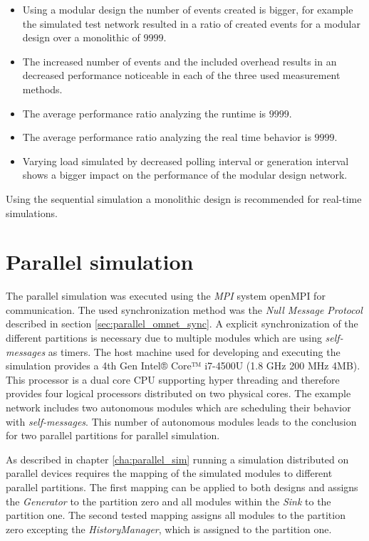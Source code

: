 \begin{itemize}
    \item Using a modular design the number of events created is bigger, for example the simulated test network resulted in a ratio of created events for a modular design over a monolithic of $9999$. %
    \item The increased number of events and the included overhead results in an decreased performance noticeable in each of the three used measurement methods.
    \item The average performance ratio analyzing the runtime is $9999$. %
    \item The average performance ratio analyzing the real time behavior is $9999$. %
    \item Varying load simulated by decreased polling interval or generation interval shows a bigger impact on the performance of the modular design network.
\end{itemize}

Using the sequential simulation a monolithic design is recommended for real-time simulations.


\section{Parallel simulation}
\label{sec:measurements_parallel}
The parallel simulation was executed using the \emph{MPI} system openMPI for communication.
The used synchronization method was the \emph{Null Message Protocol} described in section \ref{sec:parallel_omnet_sync}.
A explicit synchronization of the different partitions is necessary due to multiple modules which are using \emph{self-messages} as timers.
The host machine used for developing and executing the simulation provides a 4th Gen Intel® Core™ i7-4500U (1.8 GHz 200 MHz 4MB).
This processor is a dual core CPU supporting hyper threading and therefore provides four logical processors distributed on two physical cores.
The example network includes two autonomous modules which are scheduling their behavior with \emph{self-messages}.
This number of autonomous modules leads to the conclusion for two parallel partitions for parallel simulation.

As described in chapter \ref{cha:parallel_sim} running a simulation distributed on parallel devices requires the mapping of the simulated modules to different parallel partitions.
The first mapping can be applied to both designs and assigns the \emph{Generator} to the partition zero and all modules within the \emph{Sink} to the partition one.
The second tested mapping assigns all modules to the partition zero excepting the \emph{HistoryManager}, which is assigned to the partition one.

